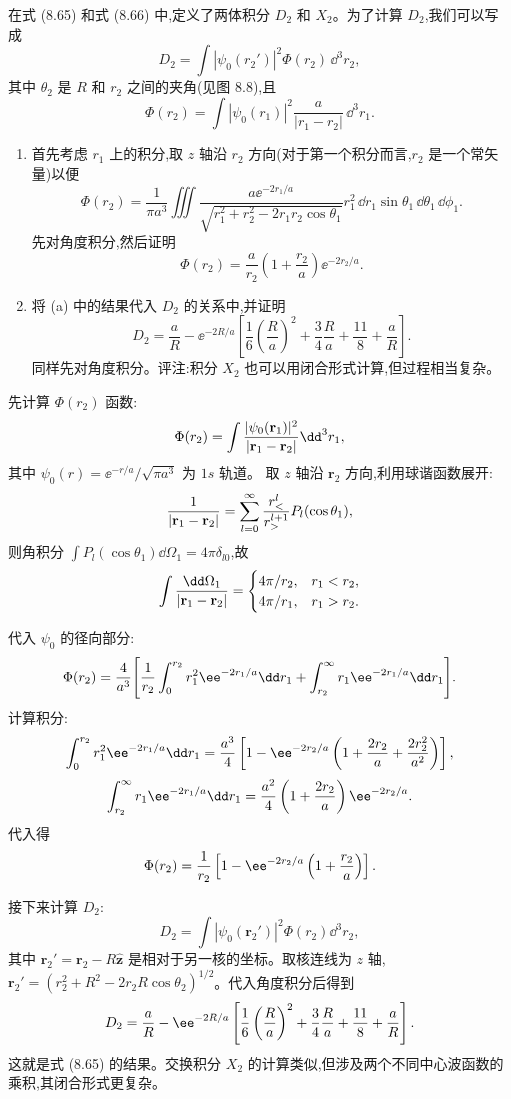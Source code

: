 \begin{question}
在式 (8.65) 和式 (8.66) 中,定义了两体积分 $D_2$ 和 $X_2$。为了计算 $D_2$,我们可以写成
\[
D_2=\int |\psi_0(r_2')|^2\Phi(r_2)\,\dd^3 r_2,
\]
其中 $\theta_2$ 是 $R$ 和 $r_2$ 之间的夹角(见图 8.8),且
\[
\Phi(r_2)=\int |\psi_0(r_1)|^2\frac{a}{|r_1-r_2|}\,\dd^3r_1.
\]
\begin{enumerate}
\item 首先考虑 $r_1$ 上的积分,取 $z$ 轴沿 $r_2$ 方向(对于第一个积分而言,$r_2$ 是一个常矢量)以便
\[
\Phi(r_2)=\frac{1}{\pi a^3}\iiint\frac{a \ee^{-2r_1/a}}{\sqrt{r_1^2+r_2^2-2r_1r_2\cos\theta_1}}r_1^2\,\dd r_1\sin\theta_1\,\dd\theta_1\,\dd\phi_1.
\]
先对角度积分,然后证明
\[
\Phi(r_2)=\frac{a}{r_2}\left(1+\frac{r_2}{a}\right)\ee^{-2r_2/a}.
\]
\item 将 (a) 中的结果代入 $D_2$ 的关系中,并证明
\[
D_2=\frac{a}{R}-\ee^{-2R/a}\left[\frac{1}{6}\left(\frac{R}{a}\right)^2+\frac34\frac{R}{a}+\frac{11}{8}+\frac{a}{R}\right].
\]
同样先对角度积分。评注:积分 $X_2$ 也可以用闭合形式计算,但过程相当复杂。
\end{enumerate}

\par\smallskip
{}

\end{question}
\begin{solution}
先计算 $\Phi(r_2)$ 函数:
\[
\Phi(r_2)=\int{|\psi_0(\mathbf r_1)|^2\over|\mathbf r_1-\mathbf r_2|}\dd^3r_1,
\]
其中 $\psi_0(r)=\ee^{-r/a}/\sqrt{\pi a^3}$ 为 $1s$ 轨道。
取 $z$ 轴沿 $\mathbf r_2$ 方向,利用球谐函数展开:
\[
{1\over|\mathbf r_1-\mathbf r_2|}=\sum_{l=0}^\infty{r_<^l\over r_>^{l+1}}P_l(\cos\theta_1),
\]
则角积分 $\int P_l(\cos\theta_1)\dd\Omega_1=4\pi\delta_{l0}$,故
\[
\int{\dd\Omega_1\over|\mathbf r_1-\mathbf r_2|}=
\begin{cases}
4\pi/r_2, & r_1<r_2,\\
4\pi/r_1, & r_1>r_2.
\end{cases}
\]

代入 $\psi_0$ 的径向部分:
\[
\Phi(r_2)={4\over a^3}\Bigg[{1\over r_2}\int_0^{r_2}r_1^2 \ee^{-2r_1/a}\dd r_1
+\int_{r_2}^\infty r_1 \ee^{-2r_1/a}\dd r_1\Bigg].
\]
计算积分:
\[
\int_0^{r_2}r_1^2\ee^{-2r_1/a}\dd r_1
={a^3\over4}\left[1-\ee^{-2r_2/a}\left(1+{2r_2\over a}+{2r_2^2\over a^2}\right)\right],
\]
\[
\int_{r_2}^\infty r_1 \ee^{-2r_1/a}\dd r_1
={a^2\over4}\left(1+{2r_2\over a}\right)\ee^{-2r_2/a}.
\]
代入得
\[
\Phi(r_2)={1\over r_2}\left[1-\ee^{-2r_2/a}\left(1+{r_2\over a}\right)\right].
\]

接下来计算 $D_2$:
\[
D_2=\int|\psi_0(\mathbf r_2')|^2\Phi(r_2)\dd^3 r_2,
\]
其中 $\mathbf r_2'=\mathbf r_2-R\hat{\mathbf z}$ 是相对于另一核的坐标。取核连线为 $z$ 轴,$\mathbf r_2'=(r_2^2+R^2-2r_2R\cos\theta_2)^{1/2}$。代入角度积分后得到
\[
D_2={a\over R}-\ee^{-2R/a}\left[{1\over6}\left({R\over a}\right)^2+{3\over4}{R\over a}+{11\over8}+{a\over R}\right].
\]
这就是式 (8.65) 的结果。交换积分 $X_2$ 的计算类似,但涉及两个不同中心波函数的乘积,其闭合形式更复杂。
\end{solution}

